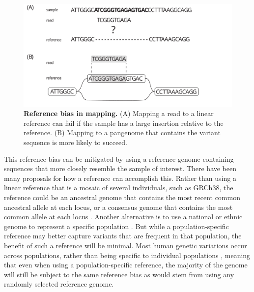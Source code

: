\documentclass[11pt]{ucscthesis}
\begin{document}
\begin{figure}
    \centering
    \includegraphics[width=\columnwidth]{mapping_example.pdf}
    \caption[Reference bias in mapping]{\textbf{Reference bias in mapping.} (A) Mapping a read to a linear reference can fail if the sample has a large insertion relative to the reference. (B) Mapping to a pangenome that contains the variant sequence is more likely to succeed.}
    \label{fig:mapping_example}
\end{figure}


This reference bias can be mitigated by using a reference genome containing sequences that more closely resemble the sample of interest.
There have been many proposals for how a reference can accomplish this.
Rather than using a linear reference that is a mosaic of several individuals, such as GRCh38, the reference could be an ancestral genome that contains the most recent common ancestral allele at each locus, or a consensus genome that contains the most common allele at each locus \cite{ballouz_is_2019}.
Another alternative is to use a national or ethnic genome to represent a specific population \cite{ballouz_is_2019,chinese_national_genome_2023,korean_national_genome_2016,vietnamese_national_genome_2015,danish_national_genome_2015,swedish_national_genome_2018,kowal_race_2019}.
But while a population-specific reference may better capture variants that are frequent in that population, the benefit of such a reference will be minimal.
Most human genetic variations occur across populations, rather than being specific to individual populations \cite{nih_understanding_2007}, meaning that even when using a population-specific reference, the majority of the genome will still be subject to the same reference bias as would stem from using any randomly selected reference genome. 
\end{document}
